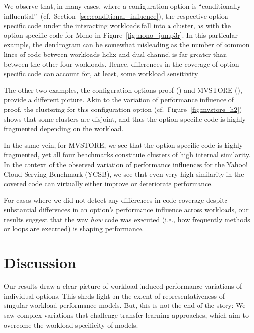 {{{We  observe that, in many cases, where  a configuration option is ``conditionally influential''~(cf.~Section~\ref{sec:conditional_influence}), the respective option-specific code under the interacting workloads fall into a cluster, as with the option-specific code for \textsf{Mono} in Figure~\ref{fig:mono_jump3r}. In this particular example, the dendrogram can be somewhat misleading as the number of common lines of code between workloads helix and dual-channel is far greater than between the other four workloads. Hence, differences in the coverage of option-specific code can account for, at least, some workload sensitivity.

The other two examples, the configuration options \textsf{proof} (\zdrei) and \textsf{MVSTORE} (\htwo), provide a different picture. Akin to the variation of performance influence of \textsf{proof}, the clustering for this configuration option (cf.~Figure~\ref{fig:mvstore_h2}) shows that some clusters are disjoint, and thus the option-specific code is highly fragmented depending on the workload. 

In the same vein, for \textsf{MVSTORE}, we see that the option-specific code is highly fragmented, yet all four benchmarks constitute clusters of high internal similarity. In the context of the observed variation of performance influences for the Yahoo! Cloud Serving Benchmark (YCSB), we see that even very high similarity in the covered code can virtually either improve or deteriorate performance.

For cases where we did not detect any differences in code coverage despite substantial differences in an option's performance influence across workloads, our results suggest that the way \emph{how} code was executed (i.e., how frequently methods or loops are executed) is shaping performance.

\color{black}
\section{Discussion}\label{sec:discussion}
Our results draw a clear picture of workload-induced performance variations of individual options. This sheds light on the extent of representativeness of singular-workload performance models. But, this is not the end of the story: We saw complex variations that challenge transfer-learning approaches, which aim to overcome the workload specificity of models.


}}}
